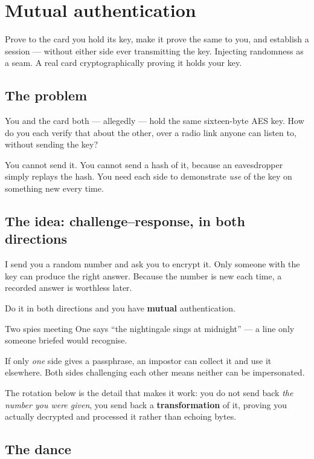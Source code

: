 \chapter{Mutual authentication}
\label{ch:auth}

\chapterbrief
  {Prove to the card you hold its key, make it prove the same to you, and establish a session --- without either side ever transmitting the key.}
  {Injecting randomness as a seam.}
  {A real card cryptographically proving it holds your key.}

\section{The problem}

You and the card both --- allegedly --- hold the same sixteen-byte AES key. How
do you each verify that about the other, over a radio link anyone can listen to,
without sending the key?

You cannot send it. You cannot send a hash of it, because an eavesdropper simply
replays the hash. You need each side to demonstrate \emph{use} of the key on
something new every time.

\section{The idea: challenge--response, in both directions}

I send you a random number and ask you to encrypt it. Only someone with the key
can produce the right answer. Because the number is new each time, a recorded
answer is worthless later.

Do it in both directions and you have \textbf{mutual} authentication.

\begin{analogy}{Two spies meeting}
One says ``the nightingale sings at midnight'' --- a line only someone briefed
would recognise.

If only \emph{one} side gives a passphrase, an impostor can collect it and use it
elsewhere. Both sides challenging each other means neither can be impersonated.

The rotation below is the detail that makes it work: you do not send back
\emph{the number you were given}, you send back a \textbf{transformation} of it,
proving you actually decrypted and processed it rather than echoing bytes.
\end{analogy}

\section{The dance}

